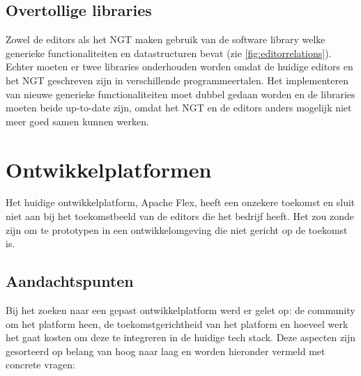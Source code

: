 \subsection{Overtollige libraries}
Zowel de editors als het NGT maken gebruik van de \organisation{} software library welke generieke functionaliteiten en datastructuren bevat (zie \autoref{fig:editorrelations}). Echter moeten er twee libraries onderhouden worden omdat de huidige editors en het NGT geschreven zijn in verschillende programmeertalen. Het implementeren van nieuwe generieke functionaliteiten moet dubbel gedaan worden en de libraries moeten beide up-to-date zijn, omdat het NGT en de editors anders mogelijk niet meer goed samen kunnen werken.

\pagebreak
\section{Ontwikkelplatformen}
Het huidige ontwikkelplatform, Apache Flex, heeft een onzekere toekomst en sluit niet aan bij het toekomstbeeld van de editors die het bedrijf heeft. Het zou zonde zijn om te prototypen in een ontwikkelomgeving die niet gericht op de toekomst is.

\subsection{Aandachtspunten}
Bij het zoeken naar een gepast ontwikkelplatform werd er gelet op: de community om het platform heen, de toekomstgerichtheid van het platform en hoeveel werk het gaat kosten om deze te integreren in de huidige tech stack. Deze aspecten zijn gesorteerd op belang van hoog naar laag en worden hieronder vermeld met concrete vragen:

